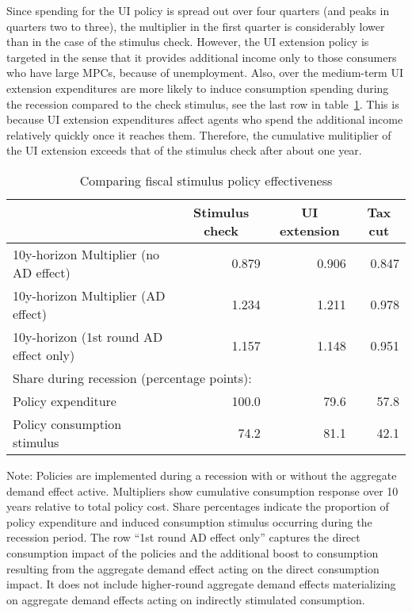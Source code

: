 \documentclass[qe]{econsocart}
\begin{document}
Since spending for the UI policy is spread out over four quarters (and peaks in quarters two to three), the multiplier in the first quarter is considerably lower than in the case of the stimulus check.
However, the UI extension policy is targeted in the sense that it provides additional income only to those consumers who have large MPCs, because of unemployment.
Also, over the medium-term UI extension expenditures   are more likely to induce consumption spending during the recession compared to the check stimulus, see the last row in table~\ref{tab:Multiplier}.
This is because UI extension expenditures affect agents who spend the additional income relatively quickly once it reaches them.
Therefore, the cumulative mulitiplier of the UI extension exceeds that of the stimulus check after about one year.

\begin{table}[tb] 
  \caption{Comparing fiscal stimulus policy effectiveness}
  \label{tab:Multiplier} 
  \centering

  \begin{tabular*}
    {\textwidth}{@{\extracolsep{\fill}}lrrr@{}} 
    \hline
    & \multicolumn{1}{c}{Stimulus check} & \multicolumn{1}{c}{UI extension} & \multicolumn{1}{c}{Tax cut} \\ \hline
    10y-horizon Multiplier (no AD effect)      & 0.879 & 0.906 & 0.847 \\
    10y-horizon Multiplier (AD effect)         & 1.234 & 1.211 & 0.978 \\
    10y-horizon (1st round AD effect only)     & 1.157 & 1.148 & 0.951 \\
    \hline
    \multicolumn{4}{l}{Share during recession (percentage points):} \\
    Policy expenditure                          & 100.0 &  79.6 &  57.8 \\
    Policy consumption stimulus                 &  74.2 &  81.1 &  42.1 \\
    \hline
  \end{tabular*}

  \noindent\parbox{\textwidth}{
    \medskip
    \footnotesize Note: Policies are implemented during a recession with or without the aggregate demand effect active. Multipliers show cumulative consumption response over 10 years relative to total policy cost. Share percentages indicate the proportion of policy expenditure and induced consumption stimulus occurring during the recession period. The row ``1st round AD effect only'' captures the direct consumption impact of the policies and the additional boost to consumption resulting from the aggregate demand effect acting on the direct consumption impact. It does not include higher-round aggregate demand effects materializing on aggregate demand effects acting on indirectly stimulated consumption.
  }
\end{table}
\end{document}
